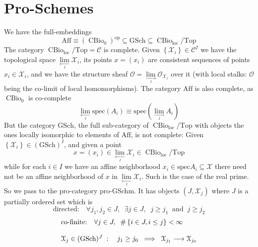 \documentclass[leqno]{article}
\renewcommand{\top}{\text{Top}}
\newcommand{\xspace}{\mathcal{X}}
\newcommand{\op}{\text{op}}
\DeclareMathOperator{\cbio}{CBio}
\numberwithin{equation}{section}
\begin{document}
\section{Pro-Schemes} \label{sec:8}
We have the full-embeddings 
\begin{equation}
				\text{Aff}\equiv \left( \cbio_{0} \right)^{\op} \subseteq \text{GSch} \subseteq
				\cbio_{\text{loc}}/\top
				\label{eq:8.1}
\end{equation}
The category $\cbio_{\text{loc}}/\top=\mathcal{C}$ is complete. Given 
$\left\{ \xspace_i \right\}\in\mathcal{C}^{I}$ we have the topological space
$\lim\limits_{\underset{I}{\leftarrow}}\xspace_{i}$, its points $x=(x_{i})$ are 
consistent sequences of points $x_{i}\in \xspace_{i}$, and we have the structure
sheaf $\mathscr{O}=\lim\limits_{\underset{I}{\rightarrow}}\mathscr{O}_{\xspace_{i}}$ over it
(with local stalks: $\mathscr{O}$ being the co-limit of
local homomorphisms). The category $\text{Aff}$ is also complete, as $\cbio_0$ is
co-complete
\begin{equation}
				\lim_{\underset{I}{\leftarrow}}\text{spec}(A_i)\equiv\text{spec}(\lim\limits_{\underset{I}{\rightarrow}}A_{i}) 
				\label{eq:8.2}
\end{equation}
But the category $\text{GSch}$, the full sub-category of
$\cbio_{\text{loc}}/\top$ with objects the ones locally isomorphic to elements of
$\text{Aff}$, is not complete: Given $\left\{ \xspace_{i} \right\}\in \left(
				\text{GSch}
\right)^{I}$, and given a point 
\begin{equation}
				x=(x_{i}) \in \lim_{\underset{I}{\leftarrow}}\xspace_i\in \cbio_{\text{loc}}/\top
				\label{eq:8.3}
\end{equation}
while for each $i\in I$ we have an affine neighborhood $x_{i}\in \text{spec}
A_{i}\subseteq\xspace$ there need not be an affine neighborhood of $x$ in
$\lim\limits_{\underset{I}{\leftarrow}}\xspace_{i}$. Such is the case of the real prime. 
So we pass to the pro-category pro-GSchm. It has objects $(J,\xspace_{j})$ where $J$ is a
partially ordered set which is 
\begin{equation}
				\text{directed:}\quad \forall j_1,j_2\in J,\;\; \exists j\in J ,\;\; j\ge j_1 \;\;
				\text{and}\;\; j\ge j_{2}
				\label{eq:8.4}
\end{equation}
\begin{equation}
				\begin{array}[H]{l}
				\text{co-finite:}\quad \forall j\in J,\;\; \#\left\{ i\in J, i\le j
				\right\}<\infty \\\\
\xspace_{j}\in (\text{GSch})^{J}\;:\quad j_{1}\ge j_{0}\;\;\Longrightarrow \;\;
				\xspace_{j_1}\longrightarrow \xspace_{j_0}
				\end{array}
				\label{eq:8.5}
\end{equation}
\end{document}
